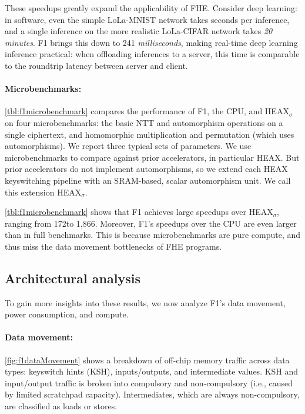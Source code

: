 These speedups greatly expand the applicability of FHE. Consider deep learning:
in software, even the simple LoLa-MNIST network takes seconds per inference,
and a single inference on the more realistic LoLa-CIFAR network takes \emph{20 minutes}.
F1 brings this down to 241 \emph{milliseconds},
making real-time deep learning inference practical:
when offloading inferences to a server, this time is comparable
to the roundtrip latency between server and client.

\paragraph{Microbenchmarks:}
\autoref{tbl:f1microbenchmark} compares the performance of F1, the CPU, and HEAX$_\sigma$ on four microbenchmarks:
the basic NTT and automorphism operations on a single ciphertext,
and homomorphic multiplication and permutation (which uses automorphisms).
We report three typical sets of parameters.
We use microbenchmarks to compare against prior accelerators,
in particular HEAX.
But prior accelerators do not implement automorphisms,
so we extend each HEAX keyswitching pipeline with an SRAM-based, scalar automorphism unit.
We call this extension HEAX$_\sigma$.

\autoref{tbl:f1microbenchmark} shows that
F1 achieves large speedups over HEAX$_\sigma$,
ranging from 172\x to 1,866\x.
Moreover, F1's speedups over the CPU are even larger than in full benchmarks.
This is because microbenchmarks are pure compute,
and thus miss the data movement bottlenecks of FHE programs.

\subsection{Architectural analysis}

To gain more insights into these results, we now analyze F1's data movement, power consumption, and compute.

\paragraph{Data movement:}
\autoref{fig:f1dataMovement} shows a breakdown of off-chip memory traffic across data types:
keyswitch hints (KSH), inputs/outputs, and intermediate values.
KSH and input/output traffic is broken into compulsory and
non-compulsory (i.e., caused by limited scratchpad capacity).
Intermediates, which are always non-compulsory, are classified as loads or stores.

